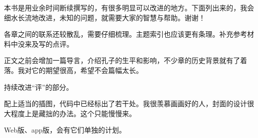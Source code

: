本书是用业余时间断续撰写的，有很多明显可以改进的地方。下面列出来的，我会细水长流地改进，未知的问题，就需要大家的智慧与帮助。谢谢！
\begin{lyitemize}
\item 各章之间的联系还较散乱，需要仔细梳理。主题索引也应该更有条理。补充参考材料中没来及写的点评。
\item 正文之前会增加一篇导言，介绍孔子的生平和影响，不少章的历史背景就有了着落。我对它的期望很高，希望不会篇幅太长。
\item 持续改进“评”的部分。
\item 配上适当的插图，代码中已经标出了若干处。我很羡慕画画好的人，封面的设计很大程度上是藏拙的办法。这个只能慢慢来。
\item Web版、app版，会有它们单独的计划。
\end{lyitemize}

